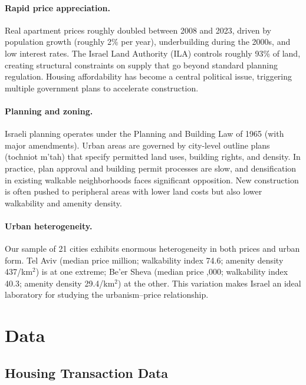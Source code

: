 \documentclass[12pt,a4paper]{article}
\begin{document}
\paragraph{Rapid price appreciation.}  Real apartment prices roughly doubled
between 2008 and 2023, driven by population growth (roughly 2\% per year),
underbuilding during the 2000s, and low interest rates.  The Israel Land
Authority (ILA) controls roughly 93\% of land, creating structural constraints
on supply that go beyond standard planning regulation.  Housing affordability
has become a central political issue, triggering multiple government plans to
accelerate construction.

\paragraph{Planning and zoning.}  Israeli planning operates under the Planning
and Building Law of 1965 (with major amendments).  Urban areas are governed by
city-level outline plans (toch\-niot m'tah) that specify permitted land uses,
building rights, and density.  In practice, plan approval and building permit
processes are slow, and densification in existing walkable neighborhoods faces
significant opposition.  New construction is often pushed to peripheral areas
with lower land costs but also lower walkability and amenity density.

\paragraph{Urban heterogeneity.}  Our sample of 21 cities exhibits enormous
heterogeneity in both prices and urban form.  Tel Aviv (median price
 million; walkability index 74.6; amenity density 437/km$^2$)
is at one extreme; Be'er Sheva (median price ,000; walkability
index 40.3; amenity density 29.4/km$^2$) at the other.  This variation makes
Israel an ideal laboratory for studying the urbanism–price relationship.

\section{Data}
\label{sec:data}

\subsection{Housing Transaction Data}
\label{sec:data_housing}
\end{document}
